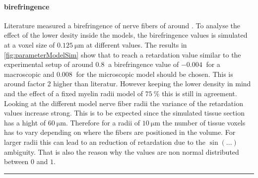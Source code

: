 % 
%
% 
\paragraph{birefringence}
% 
Literature measured a birefringence of nerve fibers of around \dummy{}. 
To analyse the effect of the lower desity inside the models, the birefringence values is simulated at a voxel size of $\SI{0.125}{\micro\meter}$ at different values.
The results in \cref{fig:parameterModelSim} show that to reach a retardation value similar to the experimental setup of around $\SI{0.8}{}$ a birefringence value of $\SI{-0.004}{}$ for a macroscopic and $\SI{0.008}{}$ for the microscopic model should be chosen.
This is around factor 2  higher than literatur.
However keeping the lower density in mind and the effect of a fixed myelin radii model of $\SI{75}{\percent}$ this is still in agreement.
Looking at the different model nerve fiber radii the variance of the retardation values increase strong.
This is to be expected since the simulated tissue section has a hight of $\SI{60}{\micro\meter}$.
Therefore for a radii of $\SI{10}{\micro\meter}$ the number of tissue voxels has to vary depending on where the fibers are positioned in the volume.
For larger radii this can lead to an reduction of retardation due to the $\sin(...)$ ambiguity.
That is also the reason why the values are non normal distributed between $\si{0}$ and $\si{1}$.
%  
% 
\noindent\rule{\textwidth}{4.2pt}
% 
